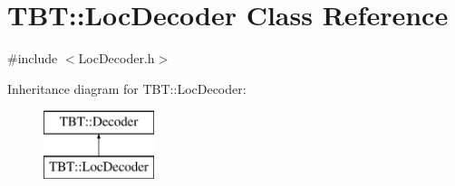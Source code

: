 \hypertarget{classTBT_1_1LocDecoder}{}\section{T\+BT\+:\+:Loc\+Decoder Class Reference}
\label{classTBT_1_1LocDecoder}


{\ttfamily \#include $<$Loc\+Decoder.\+h$>$}

Inheritance diagram for T\+BT\+:\+:Loc\+Decoder\+:\begin{figure}[H]
\begin{center}
\leavevmode
\includegraphics[height=2.000000cm]{classTBT_1_1LocDecoder}
\end{center}
\end{figure}
